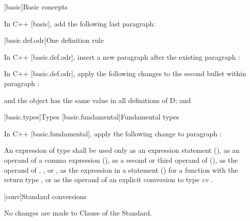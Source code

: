 
[basic]{Basic concepts}

\pnum
In C++ [basic], add the following last paragraph:

\begin{std.txt}
\end{std.txt}



\setcounter{section}{1}
[basic.def.odr]{One definition rule}

\pnum
In C++ [basic.def.odr], insert a new paragraph after the existing paragraph :

\begin{std.txt}
\end{std.txt}

\pnum
In C++ [basic.def.odr], apply the following changes to the second bullet within paragraph :

\begin{std.txt}
and the object has the same value in all definitions of D; and
\end{std.txt}

\setcounter{section}{8}
[basic.types]{Types}
[basic.fundamental]{Fundamental types}

\pnum
In C++ [basic.fundamental], apply the following change to paragraph :

\begin{std.txt}
An expression of type  shall be used only as an expression
statement (), as an operand of a comma expression
(), as a second or
third operand of  (), as the operand of ,
,  or , as the
expression in a  statement () for a function with the return type
, or as the operand of an explicit conversion to type
\emph{cv} .
\end{std.txt}

[conv]{Standard conversions}

No changes are made to Clause \the\value{chapter} of the \Cpp Standard.
